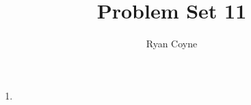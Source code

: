 \documentclass[12pt]{article}
\begin{document}
    \title{Problem Set 11}
    \author{Ryan Coyne}
    \maketitle

    \begin{enumerate}
        \item 
    \end{enumerate}
\end{document}
